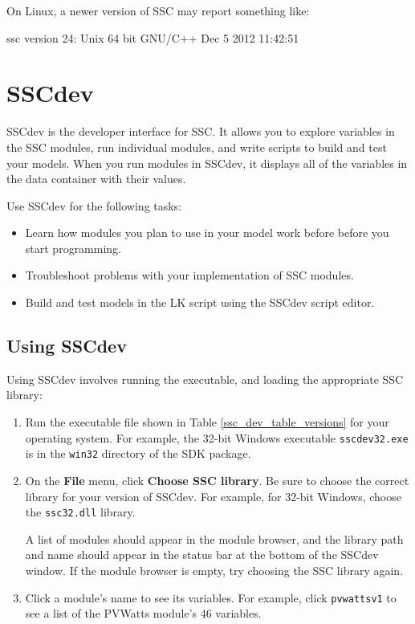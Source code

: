 \documentclass{article}
\begin{document}
On Linux, a newer version of SSC may report something like:
\begin{verbatimtab}[4]
	ssc version 24: Unix 64 bit GNU/C++ Dec  5 2012 11:42:51
\end{verbatimtab}

\section{SSCdev}
\label{sec_sscdev}

SSCdev is the developer interface for SSC. It allows you to explore variables in the SSC modules, run individual modules, and write scripts to build and test your models. When you run modules in SSCdev, it displays all of the variables in the data container with their values.

Use SSCdev for the following tasks:

\begin{itemize}
\item Learn how modules you plan to use in your model work before before you start programming.
\item Troubleshoot problems with your implementation of SSC modules.
\item Build and test models in the LK script using the SSCdev script editor.
\end{itemize}

\subsection{Using SSCdev}
\label{sec_sscdev_get_started}

Using SSCdev involves running the executable, and loading the appropriate SSC library:

\begin{enumerate}
\item Run the executable file shown in Table \ref{ssc_dev_table_versions} for your operating system. For example, the 32-bit Windows executable \texttt{sscdev32.exe} is in the \texttt{win32} directory of the SDK package.
\item On the \textbf{File} menu, click \textbf{Choose SSC library}. Be sure to choose the correct library for your version of SSCdev. For example, for 32-bit Windows, choose the \texttt{ssc32.dll} library.

A list of modules should appear in the module browser, and the library path and name should appear in the status bar at the bottom of the SSCdev window. If the module browser is empty, try choosing the SSC library again.
\item Click a module's name to see its variables. For example, click \texttt{pvwattsv1} to see a list of the PVWatts module's 46 variables.
\end{enumerate}
\end{document}
